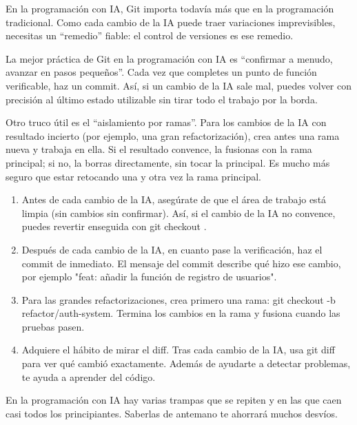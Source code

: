 
En la programación con IA, Git importa todavía más que en la programación tradicional. Como cada cambio de la IA puede traer variaciones imprevisibles, necesitas un “remedio” fiable: el control de versiones es ese remedio.

La mejor práctica de Git en la programación con IA es “confirmar a menudo, avanzar en pasos pequeños”. Cada vez que completes un punto de función verificable, haz un commit. Así, si un cambio de la IA sale mal, puedes volver con precisión al último estado utilizable sin tirar todo el trabajo por la borda.

Otro truco útil es el “aislamiento por ramas”. Para los cambios de la IA con resultado incierto (por ejemplo, una gran refactorización), crea antes una rama nueva y trabaja en ella. Si el resultado convence, la fusionas con la rama principal; si no, la borras directamente, sin tocar la principal. Es mucho más seguro que estar retocando una y otra vez la rama principal.

\begin{enumerate}
  \item Antes de cada cambio de la IA, asegúrate de que el área de trabajo está limpia (sin cambios sin confirmar). Así, si el cambio de la IA no convence, puedes revertir enseguida con git checkout .
  \item Después de cada cambio de la IA, en cuanto pase la verificación, haz el commit de inmediato. El mensaje del commit describe qué hizo ese cambio, por ejemplo "feat: añadir la función de registro de usuarios".
  \item Para las grandes refactorizaciones, crea primero una rama: git checkout -b refactor/auth-system. Termina los cambios en la rama y fusiona cuando las pruebas pasen.
  \item Adquiere el hábito de mirar el diff. Tras cada cambio de la IA, usa git diff para ver qué cambió exactamente. Además de ayudarte a detectar problemas, te ayuda a aprender del código.
\end{enumerate}


En la programación con IA hay varias trampas que se repiten y en las que caen casi todos los principiantes. Saberlas de antemano te ahorrará muchos desvíos.


